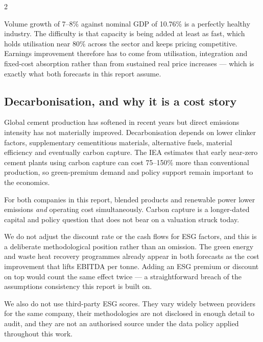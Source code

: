 \begin{paracol}{2}
\begin{keybox}
Volume growth of 7--8\% against nominal GDP of 10.76\% is a perfectly healthy
industry. The difficulty is that capacity is being added at least as fast, which holds
utilisation near 80\% across the sector and keeps pricing competitive. Earnings
improvement therefore has to come from utilisation, integration and fixed-cost
absorption rather than from sustained real price increases — which is exactly what
both forecasts in this report assume.
\end{keybox}

\subsection{Decarbonisation, and why it is a cost story}

Global cement production has softened in recent years but direct emissions intensity
has not materially improved. Decarbonisation depends on lower clinker factors,
supplementary cementitious materials, alternative fuels, material efficiency and
eventually carbon capture. The IEA estimates that early near-zero cement plants using
carbon capture can cost 75--150\% more than conventional production, so green-premium
demand and policy support remain important to the economics.

For both companies in this report, blended products and renewable power lower
emissions \emph{and} operating cost simultaneously. Carbon capture is a longer-dated
capital and policy question that does not bear on a valuation struck today.

\begin{warnbox}
We do not adjust the discount rate or the cash flows for ESG factors, and this is a
deliberate methodological position rather than an omission. The green energy and waste
heat recovery programmes already appear in both forecasts as the cost improvement that
lifts EBITDA per tonne. Adding an ESG premium or discount on top would count the same
effect twice — a straightforward breach of the assumptions consistency this report is
built on.

We also do not use third-party ESG scores. They vary widely between providers for the
same company, their methodologies are not disclosed in enough detail to audit, and
they are not an authorised source under the data policy applied throughout this work.
\end{warnbox}


\end{paracol}

